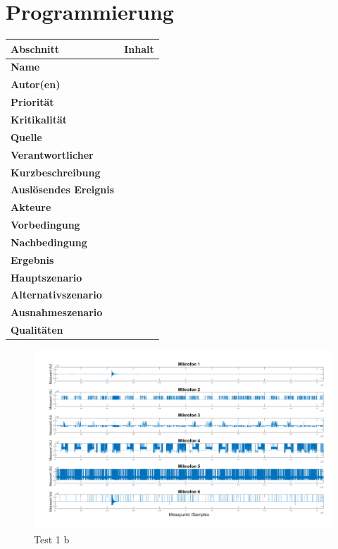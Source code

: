 \section{Programmierung}

\begin{tabularx}{\columnwidth}{|p{4cm}|X|}
	\hline
	\textbf{Abschnitt} & \textbf{Inhalt}\\
	\hline
	\textbf{Name} & \\
	\hline
	\textbf{Autor(en)} & \\
	\hline
	\textbf{Priorität} & \\	
	\hline	
	\textbf{Kritikalität} &\\
	\hline
	\textbf{Quelle} & \\
	\hline
	\textbf{Verantwortlicher} & \\
	\hline
	\textbf{Kurzbeschreibung} & \\
	\hline
	\textbf{Auslösendes Ereignis} & \\
	\hline
	\textbf{Akteure} & \\
	\hline
	\textbf{Vorbedingung} & \\
	\hline
	\textbf{Nachbedingung} & \\
	\hline
	\textbf{Ergebnis} & \\
	\hline
	\textbf{Hauptszenario} &\\
	\hline
	\textbf{Alternativszenario} & \\
	\hline
	\textbf{Ausnahmeszenario} & \\
	\hline
	\textbf{Qualitäten} & \\
	\hline
\end{tabularx}
\label{tab:}

\newpage
%

\begin{figure}[h]
	\begin{center}
		\includegraphics[width=\textwidth]{Sections/Programmierung/Test_1_d}
	\end{center}
	\caption{Test 1 b}
	\label{fig:Test_1_b}
\end{figure}


